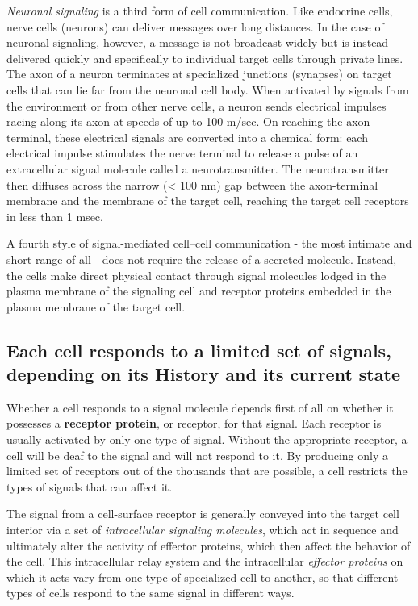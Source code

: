 \textit{Neuronal signaling} is a third form of cell communication. Like endocrine
cells, nerve cells (neurons) can deliver messages over long distances.
In the case of neuronal signaling, however, a message is not broadcast
widely but is instead delivered quickly and specifically to individual target
cells through private lines. The axon of a neuron terminates at specialized 
junctions (synapses) on target cells that can lie far from the neuronal cell body.
When activated by signals from the environment or from other
nerve cells, a neuron sends electrical impulses racing along its axon at
speeds of up to 100 m/sec. On reaching the axon terminal, these electrical 
signals are converted into a chemical form: each electrical impulse
stimulates the nerve terminal to release a pulse of an extracellular signal
molecule called a neurotransmitter. The neurotransmitter then diffuses
across the narrow (< 100 nm) gap between the axon-terminal membrane
and the membrane of the target cell, reaching the target cell receptors in
less than 1 msec.

A fourth style of signal-mediated cell–cell communication - the most intimate 
and short-range of all - does not require the release of a secreted
molecule. Instead, the cells make direct physical contact through signal 
molecules lodged in the plasma membrane of the signaling cell and
receptor proteins embedded in the plasma membrane of the target cell.

\subsection{Each cell responds to a limited set of signals, depending on its History and its current state}

Whether a cell responds to a signal molecule depends first of all on
whether it possesses a \textbf{receptor protein}, or receptor, for that signal.
Each receptor is usually activated by only one type of signal. Without the
appropriate receptor, a cell will be deaf to the signal and will not respond
to it. By producing only a limited set of receptors out of the thousands
that are possible, a cell restricts the types of signals that can affect it.

The signal from a cell-surface
receptor is generally conveyed into the target cell interior via a set of
\textit{intracellular signaling molecules}, which act in sequence and ultimately
alter the activity of effector proteins, which then affect the behavior of the
cell. This intracellular relay system and the intracellular \textit{effector proteins}
on which it acts vary from one type of specialized cell to another, so that
different types of cells respond to the same signal in different ways.

